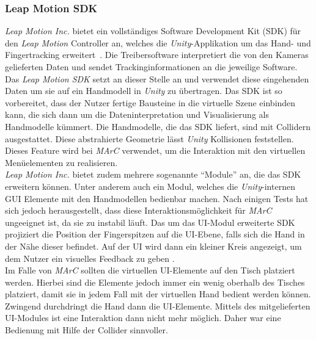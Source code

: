 \subsubsection{Leap Motion SDK} \label{sec:LeapSDK}
\textit{Leap Motion Inc.} bietet ein vollständiges Software Development Kit (SDK) für den \textit{Leap Motion} Controller an, welches die \textit{Unity}-Applikation um das Hand- und Fingertracking erweitert~\cite{website:leapMotionSDK}. Die Treibersoftware interpretiert die von den Kameras gelieferten Daten und sendet Trackinginformationen an die jeweilige Software. Das \textit{Leap Motion SDK} setzt an dieser Stelle an und verwendet diese eingehenden Daten um sie auf ein Handmodell in \textit{Unity} zu übertragen. Das SDK ist so vorbereitet, dass der Nutzer fertige Bausteine in die virtuelle Szene einbinden kann, die sich dann um die Dateninterpretation und Visualisierung als Handmodelle kümmert. Die Handmodelle, die das SDK liefert, sind mit Collidern ausgestattet. Diese abstrahierte Geometrie lässt \textit{Unity} Kollisionen feststellen. Dieses Feature wird bei \textit{MArC} verwendet, um die Interaktion mit den virtuellen Menüelementen zu realisieren.\\
\textit{Leap Motion Inc.} bietet zudem mehrere sogenannte  "`Module"'  an, die das SDK erweitern können. Unter anderem auch ein Modul, welches die \textit{Unity}-internen GUI Elemente mit den Handmodellen bedienbar machen. Nach einigen Tests hat sich jedoch herausgestellt, dass diese Interaktionsmöglichkeit für \textit{MArC} ungeeignet ist, da sie zu instabil läuft. Das um das UI-Modul erweiterte SDK projiziert die Position der Fingerspitzen auf die UI-Ebene, falls sich die Hand in der Nähe dieser befindet. Auf der UI wird dann ein kleiner Kreis angezeigt, um dem Nutzer ein visuelles Feedback zu geben \cite{website:leapMotionSDKUI}.\\
Im Falle von \textit{MArC} sollten die virtuellen UI-Elemente auf den Tisch platziert werden. Hierbei sind die Elemente jedoch immer ein wenig oberhalb des Tisches platziert, damit sie in jedem Fall mit der virtuellen Hand bedient werden können. Zwingend durchdringt die Hand dann die UI-Elemente. Mittels des mitgelieferten UI-Modules ist eine Interaktion dann nicht mehr möglich. Daher war eine Bedienung mit Hilfe der Collider sinnvoller.



\newpage